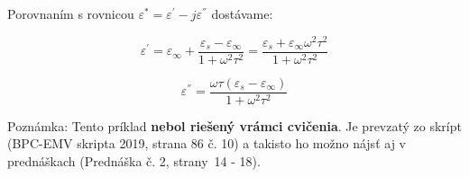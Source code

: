 Porovnaním s rovnicou ${\varepsilon^{*}}={\varepsilon^{'}}-{j\varepsilon^{''}}$ dostávame:

\begin{equation*}
    {\varepsilon^{'}}={\varepsilon_\infty}+\frac{{\varepsilon_s}-{\varepsilon_\infty}}{1+{\omega}^2{\tau}^2}=\frac{{\varepsilon_s}+{\varepsilon_\infty}{\omega}^2{\tau}^2}{1+{\omega}^2{\tau}^2} \tag{Reálna časť}
\end{equation*}

\begin{equation*}
    {\varepsilon^{''}}=\frac{\omega\tau({\varepsilon_s}-{\varepsilon_\infty})}{1+{\omega}^2{\tau}^2} \tag{Imaginárna časť}
\end{equation*}

\color{red}Poznámka: Tento príklad \textbf{nebol riešený vrámci cvičenia}. Je prevzatý zo skrípt (BPC-EMV skripta 2019, strana 86 č. 10) a takisto ho možno nájsť aj v prednáškach (Prednáška č. 2, strany~14 - 18). \\

\color{black}



